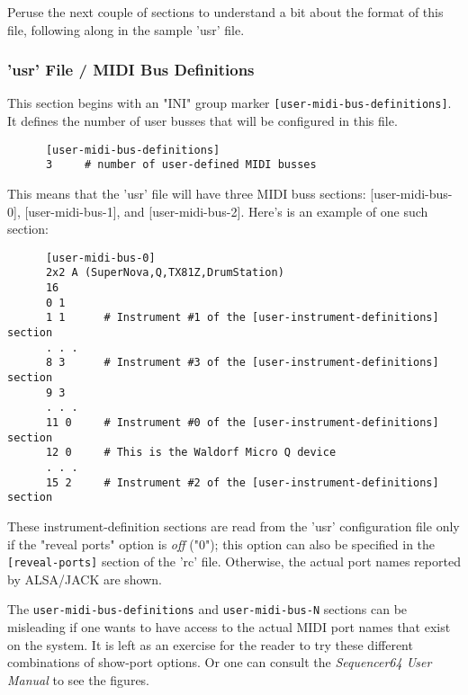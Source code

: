    Peruse the next couple of sections to understand a bit about the format of
   this file, following along in the sample 'usr' file.

\subsubsection{'usr' File / MIDI Bus Definitions}
\label{subsubsec:usr_file_midi_bus_definitions}

   This section begins with an
   "INI" group marker \texttt{[user-midi-bus-definitions]}.
   It defines the number of user busses that will be configured in this file.

   \begin{verbatim}
      [user-midi-bus-definitions]
      3     # number of user-defined MIDI busses
   \end{verbatim}

   This means that the 'usr' file will have three MIDI buss
   sections: [user-midi-bus-0], [user-midi-bus-1], and [user-midi-bus-2].
   Here's is an example of one such section:

   \begin{verbatim}
      [user-midi-bus-0]
      2x2 A (SuperNova,Q,TX81Z,DrumStation)
      16
      0 1
      1 1      # Instrument #1 of the [user-instrument-definitions] section
      . . .
      8 3      # Instrument #3 of the [user-instrument-definitions] section
      9 3
      . . .
      11 0     # Instrument #0 of the [user-instrument-definitions] section
      12 0     # This is the Waldorf Micro Q device
      . . .
      15 2     # Instrument #2 of the [user-instrument-definitions] section
   \end{verbatim}

   These instrument-definition
   sections are read from the 'usr' configuration file only if
   the "reveal ports" option is \textsl{off} ("0");
   this option can also be specified in the
   \texttt{[reveal-ports]} section of the 'rc' file.
   Otherwise, the actual port names reported by ALSA/JACK are shown.

   The \texttt{user-midi-bus-definitions} and \texttt{user-midi-bus-N} sections
   can be misleading if one wants to have access to the
   actual MIDI port names that exist on the system.
   It is left as an exercise for the reader to try these different combinations
   of show-port options.  Or one can consult the \textsl{Sequencer64 User
   Manual} to see the figures.

